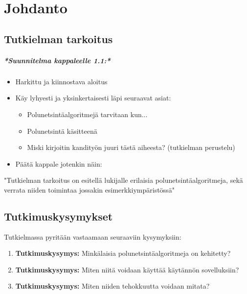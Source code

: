 \chapter{Johdanto} \label{Johdanto}

\section{Tutkielman tarkoitus}\label{tTarkoitus}
\begingroup
\itshape
\paragraph{*Suunnitelma kappaleelle 1.1:*}
\begin{itemize}
	\item Harkittu ja kiinnostava aloitus
	\item Käy lyhyesti ja yksinkertaisesti läpi seuraavat asiat:
	\begin{itemize}
		\item Polunetsintäalgoritmejä tarvitaan kun...
		\item Polunetsintä käsitteenä
		\item Miski kirjoitin kandityön juuri tästä aiheesta? (tutkielman perustelu)
	\end{itemize}
	\item Päätä kappale jotenkin näin:
\end{itemize}
"Tutkielman tarkoitus on esitellä lukijalle erilaisia polunetsintäalgoritmeja, 
sekä verrata niiden toimintaa jossakin esimerkkiympäristössä"
\endgroup

\section{Tutkimuskysymykset}\label{tutkimuskysymykset}
Tutkielmassa pyritään vastaamaan seuraaviin kysymyksiin:
\begin{enumerate}[label=\textbf{\arabic*.}]
	\item \label{tKysymys1} \textbf{Tutkimuskysymys:} Minkälaisia polunetsintäalgoritmeja on kehitetty?
	\item \label{tKysymys2} \textbf{Tutkimuskysymys:} Miten niitä voidaan käyttää käytännön sovelluksiin?
	\item \label{tKysymys3} \textbf{Tutkimuskysymys:} Miten niiden tehokkuutta voidaan mitata?
\end{enumerate}

